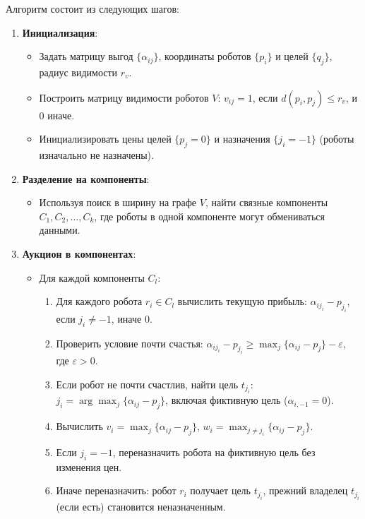Алгоритм состоит из следующих шагов:
\begin{enumerate}
    \item \textbf{Инициализация}:
    \begin{itemize}
        \item Задать матрицу выгод \( \{\alpha_{ij}\} \), координаты роботов \( \{p_i\} \) и целей \( \{q_j\} \), радиус видимости \( r_v \).
        \item Построить матрицу видимости роботов \( V \): \( v_{ij} = 1 \), если \( d(p_i, p_j) \leq r_v \), и \( 0 \) иначе.
        \item Инициализировать цены целей \( \{p_j = 0\} \) и назначения \( \{j_i = -1\} \) (роботы изначально не назначены).
    \end{itemize}
    \item \textbf{Разделение на компоненты}:
    \begin{itemize}
        \item Используя поиск в ширину на графе \( V \), найти связные компоненты \( C_1, C_2, \ldots, C_k \), где роботы в одной компоненте могут обмениваться данными.
    \end{itemize}
    \item \textbf{Аукцион в компонентах}:
    \begin{itemize}
        \item Для каждой компоненты \( C_l \):
        \begin{enumerate}
            \item Для каждого робота \( r_i \in C_l \) вычислить текущую прибыль: \( \alpha_{i j_i} - p_{j_i} \), если \( j_i \neq -1 \), иначе \( 0 \).
            \item Проверить условие почти счастья: \( \alpha_{i j_i} - p_{j_i} \geq \max_j \{\alpha_{ij} - p_j\} - \varepsilon \), где \( \varepsilon > 0 \).
            \item Если робот не почти счастлив, найти цель \( t_{j_i} \): \( j_i = \arg \max_j \{\alpha_{ij} - p_j\} \), включая фиктивную цель (\( \alpha_{i,-1} = 0 \)).
            \item Вычислить \( v_i = \max_j \{\alpha_{ij} - p_j\} \), \( w_i = \max_{j \neq j_i} \{\alpha_{ij} - p_j\} \).
            \item Если \( j_i = -1 \), переназначить робота на фиктивную цель без изменения цен.
            \item Иначе переназначить: робот \( r_i \) получает цель \( t_{j_i} \), прежний владелец \( t_{j_i} \) (если есть) становится неназначенным.

\end{enumerate}
\end{itemize}
\end{enumerate}

